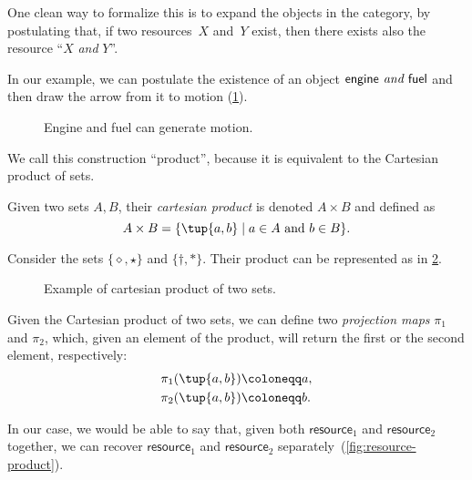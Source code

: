 One clean way to formalize this is to expand the objects in the category, by postulating that, if two resources~$X$ and~$Y$ exist, then there exists also the resource ``$X$ \emph{and} $Y$''.

In our example, we can postulate the existence of an object $\mathsf{engine} \emph{ and }
\mathsf{fuel}$ and then draw the arrow from it to motion (\cref{fig:e13}).

\begin{figure}[h!]
    \centering
    \caption{Engine and fuel can generate motion. \label{fig:e13}}
\end{figure}

We call this construction ``product'', because it is equivalent to
the Cartesian product of sets.

\begin{definition}
\label{def:cartesian-product}
   Given two sets $A,B$, their \emph{cartesian product} is denoted $A\times  B$
   and defined as 
   \begin{equation}
       A\times  B=\{ \tup{a,b}\mid a\in A\text{ and } b\in B\}.
   \end{equation}
\end{definition}

\begin{example}
Consider the sets $\{\diamond,\star\}$ and $\{\dagger, \ast\}$. Their product can be represented as in \cref{fig:cartesian-product}.
\begin{figure}[h!]
    \centering
    \caption{Example of cartesian product of two sets.\label{fig:cartesian-product}}
\end{figure}
\end{example}

\noindent Given the Cartesian product of two sets, we can define two \emph{projection maps} $\pi_1$
and $\pi_2$, which, given an element of the product, will return the first or the second
element, respectively:
\begin{equation}
\begin{aligned}
    \pi_1(\tup{a,b}) &\coloneqq a,\\
    \pi_2(\tup{a,b}) &\coloneqq b.
\end{aligned}
\end{equation}

In our case, we would be able to say that, given both $\mathsf{resource}_1$ and $\mathsf{resource}_2$ together,
we can recover $\mathsf{resource}_1$ and $\mathsf{resource}_2$ separately~(\cref{fig:resource-product}).

